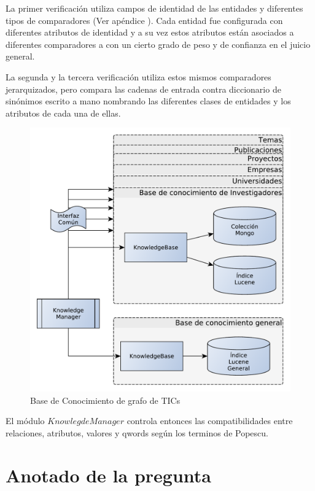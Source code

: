 La primer verificación utiliza campos de identidad de las entidades y diferentes tipos de comparadores (Ver apéndice  ). Cada entidad fue configurada con diferentes atributos de identidad y a su vez estos atributos están asociados a diferentes comparadores a con un cierto grado de peso y de confianza en el juicio general. 

La segunda y la tercera verificación utiliza estos mismos comparadores jerarquizados, pero compara las cadenas de entrada contra diccionario de sinónimos escrito a mano nombrando las diferentes clases de entidades y los atributos de cada una de ellas. 

\begin{figure}[H]
  \centering
    \includegraphics[scale=0.5]{graficos/KnowledgeManager}
  \caption{Base de Conocimiento de grafo de TICs}
  \label{fig:KnowledgeManager}
\end{figure}

El módulo $KnowlegdeManager$ controla entonces las compatibilidades entre relaciones, atributos, valores y qwords según los terminos de Popescu.

\section{Anotado de la pregunta}
\label{sec:qp-mitic}

